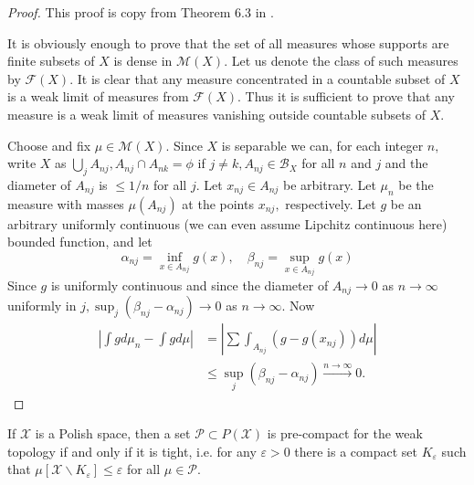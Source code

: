 \begin{proof}
	This proof is copy from Theorem 6.3 in \cite{parthasarathy2005probability}.

	It is obviously enough to prove that the set of all measures whose supports are finite subsets of \( X \) is dense in \( \mathscr { M } ( X ) . \) Let us denote the class of such measures by \( \mathscr { F } ( X ) . \) It is clear that any measure concentrated in a countable subset of \( X \) is a weak limit of measures from \( \mathscr { F } ( X ) . \) Thus it is sufficient to prove that any measure is a weak limit of measures vanishing outside countable subsets of \( X \).

	Choose and fix \( \mu \in \mathscr { M } ( X ) \). Since \( X \) is separable we can, for each integer \( n , \) write \( X \) as \( \bigcup _ { j } A _ { n j } , A _ { n j } \cap A _ { n k } = \phi \) if \( j \neq k , A _ { n j } \in \mathscr { B } _ { X } \) for all \( n \) and \( j \) and the diameter of \( A _ { n j } \) is \( \leq 1 / n \) for all \( j \). Let \( x _ { n j } \in A _ { n j } \) be arbitrary. Let \( \mu _ { n } \) be the measure with masses \( \mu \left( A _ { n j } \right) \) at the points \( x _ { n j } , \) respectively. Let $g$ be an arbitrary uniformly continuous (we can even assume Lipchitz continuous here) bounded function, and let \[ \alpha _ { n j } = \inf _ { x \in A _ { n j } } g ( x ) , \quad \beta _ { n j } = \sup _ { x \in A _ { n j } } g ( x ) \]
	Since \( g \) is uniformly continuous and since the diameter of \( A _ { n j } \rightarrow 0 \) as \( n \rightarrow \infty \) uniformly in \( j , \sup _ { j } \left( \beta _ { n j } - \alpha _ { n j } \right) \rightarrow 0 \) as \( n \rightarrow \infty \). Now
	\begin{align*}
		\left| \int g d \mu _ { n } - \int g d \mu \right| & = \left| \sum \int _ { A _ { n j } } \left( g - g \left( x _ { n j } \right) \right) d \mu \right|     \\
		                                                   & \leq \sup_{j} \left( \beta _ { n j } - \alpha _ { n j } \right) \xrightarrow{ n \rightarrow \infty} 0.
	\end{align*}
\end{proof}

\begin{thm}
	If \( \mathcal { X } \) is a Polish space, then a set \( \mathcal { P } \subset P ( \mathcal { X } ) \) is pre-compact for the weak topology if and only if it is tight, i.e. for any \( \varepsilon > 0 \) there is a compact set \( K _ { \varepsilon } \) such that \( \mu \left[ \mathcal { X } \backslash K _ { \varepsilon } \right] \leq \varepsilon \) for all \( \mu \in \mathcal { P } \).
\end{thm}

